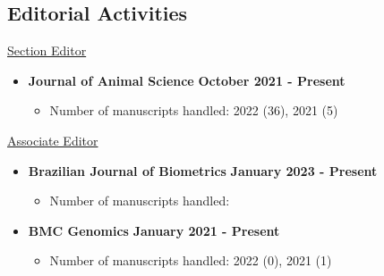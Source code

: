 \documentclass[margin,line,10pt]{res}
\begin{document}
\begin{resume}
\vspace{0.5cm}
\section{\sc Editorial Activities}


\underline{Section Editor}
\vspace{0.2cm}

\begin{itemize}
\item {\bf Journal of Animal Science} \hfill {\bf October 2021 - Present}
  \begin{itemize}
    \item Number of manuscripts handled: 2022 (36), 2021 (5)
  \end{itemize}
\end{itemize}


\underline{Associate Editor}
\vspace{0.2cm}



\begin{itemize}
  \item {\bf Brazilian Journal of Biometrics} \hfill {\bf January 2023 - Present}
    \begin{itemize}
      \item Number of manuscripts handled: 
    \end{itemize}
  \end{itemize}

  \vspace{0.3cm}

\begin{itemize}
\item {\bf BMC Genomics} \hfill {\bf January 2021 - Present}
  \begin{itemize}
    \item Number of manuscripts handled: 2022 (0), 2021 (1)
  \end{itemize}
\end{itemize}


\end{resume}
\end{document}
